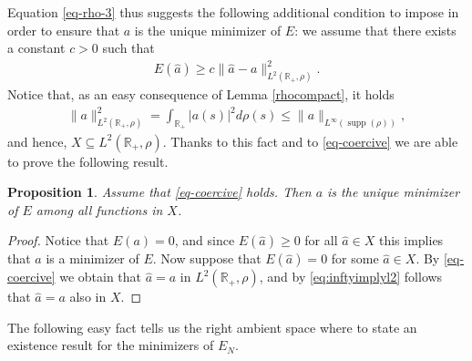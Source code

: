 \documentclass[A4paper,11pt]{article}
\newtheorem{proposition}[theorem]{Proposition}
\theoremstyle{definition}
\newcommand{\R}{\mathbb{R}}
\DeclareMathOperator{\supp}{supp}
\begin{document}
Equation \eqref{eq-rho-3} thus suggests the following additional condition to impose in order to ensure that $a$ is the unique minimizer of $E$: we assume that there exists a constant $c>0$ such that
\begin{align}\label{eq-coercive}
	E(\widehat a)\geq c\|\widehat a-a\|^2_{L^2(\R_+,\rho)}.
\end{align}
Notice that, as an easy consequence of Lemma \ref{rhocompact}, it holds
\begin{align}\label{eq:inftyimplyl2}
\|a\|^2_{L^2(\R_+,\rho)} = \int_{\R_+} \bigl|a(s)\bigr|^2 d\rho(s) \leq \|a\|_{L^{\infty}(\supp(\rho))},
\end{align}
and hence, $X\subseteq L^2(\R_+,\rho)$. Thanks to this fact and to \eqref{eq-coercive} we are able to prove the following result.

\begin{proposition}\label{uniquemin}
Assume that \eqref{eq-coercive} holds. Then $a$ is the unique minimizer of $E$ among all functions in $X$.
\end{proposition}
\begin{proof}
Notice that $E(a)=0$, and since $E(\widehat a)\geq 0$ for all $\widehat a\in X$ this implies that $a$ is a minimizer of $E$. Now suppose that $E(\widehat a)=0$ for some $\widehat a\in X$. By \eqref{eq-coercive} we obtain that $\widehat a=a$ in $L^2(\R_+,\rho)$, and by \eqref{eq:inftyimplyl2} follows that $\widehat a=a$ also in $X$.
\end{proof}

The following easy fact tells us the right ambient space where to state an existence result for the minimizers of $E_N$.
\end{document}
